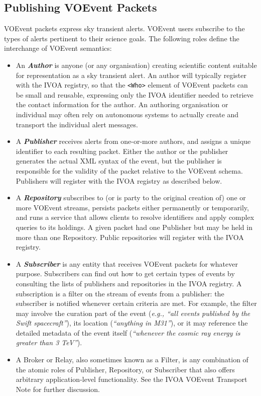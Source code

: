 \documentclass[11pt,a4paper]{ivoa}
\begin{document}
\subsection{Publishing VOEvent Packets}
\label{sec:2.1}
VOEvent packets express sky transient alerts. VOEvent users subscribe to the types of alerts pertinent to their science goals. The following roles define the interchange of VOEvent semantics: 
\begin{itemize}
\item An \emph{\bf Author} is anyone (or any organisation) creating scientific content suitable for representation as a sky transient alert. An author will typically register with the IVOA registry, so that the {\tt <Who>} element of VOEvent packets can be small and reusable, expressing only the IVOA identifier needed to retrieve the contact information for the author. An authoring organisation or individual may often rely on autonomous systems to actually create and transport the individual alert messages. 
\item A \emph{\bf Publisher} receives alerts from one-or-more authors, and assigns a unique identifier to each resulting packet. Either the author or the publisher generates the actual XML syntax of the event, but the publisher is responsible for the validity of the packet relative to the VOEvent schema. Publishers will register with the IVOA registry as described below. 
\item A \emph{\bf Repository} subscribes to (or is party to the original creation of) one or more VOEvent streams, persists packets either permanently or temporarily, and runs a service that allows clients to resolve identifiers and apply complex queries to its holdings. A given packet had one Publisher but may be held in more than one Repository. Public repositories will register with the IVOA registry. 
\item A \emph{\bf Subscriber} is any entity that receives VOEvent packets for whatever purpose. Subscribers can find out how to get certain types of events by consulting the lists of publishers and repositories in the IVOA registry. A subscription is a filter on the stream of events from a publisher: the subscriber is notified whenever certain criteria are met. For example, the filter may involve the curation part of the event (\emph{e.g., ``all events published by the Swift spacecraft''}), its location (\emph{``anything in M31''}), or it may reference the detailed metadata of the event itself (\emph{``whenever the cosmic ray energy is greater than 3 TeV''}). 
\item A Broker or Relay, also sometimes known as a Filter, is any combination of the atomic roles of Publisher, Repository, or Subscriber that also offers arbitrary application-level functionality. See the IVOA VOEvent Transport Note \citep{2011ivoa.spec.0711S} for further discussion. 
\end{itemize}
\end{document}
